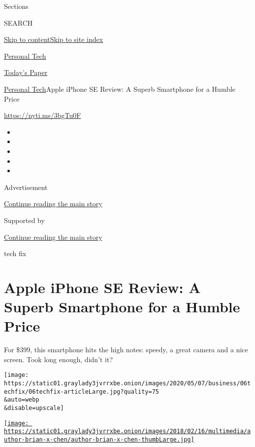 Sections

SEARCH

\protect\hyperlink{site-content}{Skip to
content}\protect\hyperlink{site-index}{Skip to site index}

\href{https://www.nytimes3xbfgragh.onion/section/technology/personaltech}{Personal
Tech}

\href{https://myaccount.nytimes3xbfgragh.onion/auth/login?response_type=cookie\&client_id=vi}{}

\href{https://www.nytimes3xbfgragh.onion/section/todayspaper}{Today's
Paper}

\href{/section/technology/personaltech}{Personal Tech}\textbar{}Apple
iPhone SE Review: A Superb Smartphone for a Humble Price

\href{https://nyti.ms/3bgTu0F}{https://nyti.ms/3bgTu0F}

\begin{itemize}
\item
\item
\item
\item
\item
\end{itemize}

Advertisement

\protect\hyperlink{after-top}{Continue reading the main story}

Supported by

\protect\hyperlink{after-sponsor}{Continue reading the main story}

tech fix

\hypertarget{apple-iphone-se-review-a-superb-smartphone-for-a-humble-price}{%
\section{Apple iPhone SE Review: A Superb Smartphone for a Humble
Price}\label{apple-iphone-se-review-a-superb-smartphone-for-a-humble-price}}

For \$399, this smartphone hits the high notes: speedy, a great camera
and a nice screen. Took long enough, didn't it?

\texttt{[image: https://static01.graylady3jvrrxbe.onion/images/2020/05/07/business/06techfix/06techfix-articleLarge.jpg?quality=75\\\&auto=webp\\\&disable=upscale]}

\href{https://www.nytimes3xbfgragh.onion/by/brian-x-chen}{\texttt{[image: https://static01.graylady3jvrrxbe.onion/images/2018/02/16/multimedia/author-brian-x-chen/author-brian-x-chen-thumbLarge.jpg]}}

